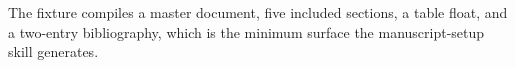 The fixture compiles a master document, five included sections, a table float, and a
two-entry bibliography, which is the minimum surface the manuscript-setup skill generates.
